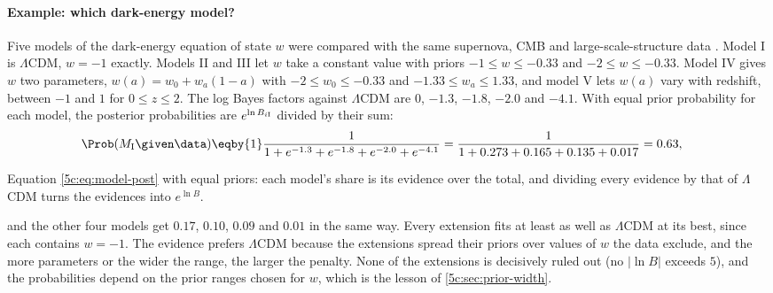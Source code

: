 \paragraph{Example: which dark-energy model?}
Five models of the dark-energy equation of state $w$ were compared with the same
supernova, CMB and large-scale-structure data . Model I is
$\Lambda$CDM, $w=-1$ exactly. Models II and III let $w$ take a constant value with
priors $-1\le w\le-0.33$ and $-2\le w\le-0.33$. Model IV gives $w$ two parameters,
$w(a)=w_0+w_a(1-a)$ with $-2\le w_0\le-0.33$ and $-1.33\le w_a\le1.33$, and model V
lets $w(a)$ vary with redshift, between $-1$ and $1$ for $0\le z\le2$. The log Bayes factors against $\Lambda$CDM are
$0$, $-1.3$, $-1.8$, $-2.0$ and $-4.1$. With equal prior probability for each model,
the posterior probabilities are $e^{\ln B_{i{\rm I}}}$ divided by their sum:
\begin{align*}
  \Prob(M_{\rm I}\given\data)
  &\eqby{1}\frac{1}{1+e^{-1.3}+e^{-1.8}+e^{-2.0}+e^{-4.1}}
   =\frac{1}{1+0.273+0.165+0.135+0.017}=0.63 ,
\end{align*}
\begin{explain}
  \item Equation \eqref{5c:eq:model-post} with equal priors: each model's share is its
        evidence over the total, and dividing every evidence by that of $\Lambda$CDM turns
        the evidences into $e^{\ln B}$.
\end{explain}
and the other four models get $0.17$, $0.10$, $0.09$ and $0.01$ in the same way. Every
extension fits at least as well as $\Lambda$CDM at its best, since each contains
$w=-1$. The evidence prefers $\Lambda$CDM because the extensions spread their priors
over values of $w$ the data exclude, and the more parameters or the wider the range,
the larger the penalty. None of the extensions is decisively ruled out
(no $\lvert\ln B\rvert$ exceeds $5$), and the probabilities depend on the prior ranges
chosen for $w$, which is the lesson of \cref{5c:sec:prior-width}.


